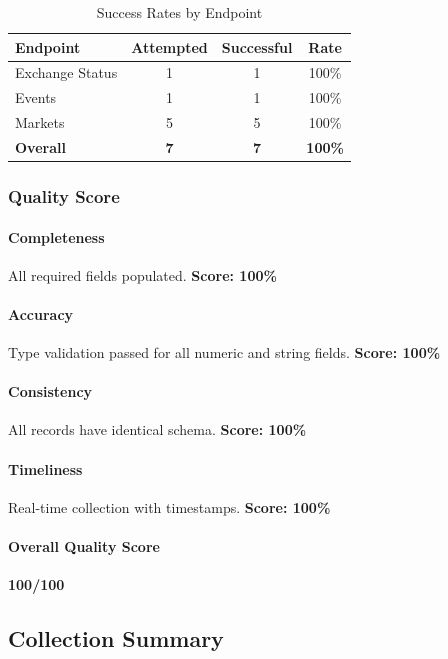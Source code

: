 \documentclass[12pt,a4paper]{article}
\begin{document}
\begin{table}[h]
\centering
\begin{tabular}{|l|c|c|c|}
\hline
\textbf{Endpoint} & \textbf{Attempted} & \textbf{Successful} & \textbf{Rate} \\
\hline
Exchange Status & 1 & 1 & 100\% \\
Events & 1 & 1 & 100\% \\
Markets & 5 & 5 & 100\% \\
\hline
\textbf{Overall} & \textbf{7} & \textbf{7} & \textbf{100\%} \\
\hline
\end{tabular}
\caption{Success Rates by Endpoint}
\label{tab:success_rates}
\end{table}

\subsubsection{Quality Score}

\paragraph{Completeness}
All required fields populated. \textbf{Score: 100\%}

\paragraph{Accuracy}
Type validation passed for all numeric and string fields. \textbf{Score: 100\%}

\paragraph{Consistency}
All records have identical schema. \textbf{Score: 100\%}

\paragraph{Timeliness}
Real-time collection with timestamps. \textbf{Score: 100\%}

\paragraph{Overall Quality Score}
\textbf{100/100}

\subsection{Collection Summary}
\end{document}
